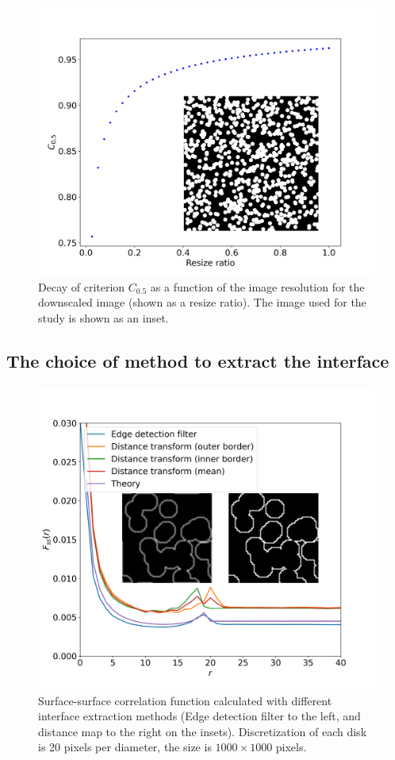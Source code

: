 \documentclass[reprint,amsmath,amssymb,aps,pre,showkeys,showpacs]{revtex4-1}
\begin{document}
\begin{figure}[ht]
  \centering
  \includegraphics[width=\linewidth]{images/plot-criterion1.png}
  \caption[]{Decay of criterion $C_{0.5}$ as a function of the image resolution
    for the downscaled image (shown as a resize ratio). The image used for the study is shown as an inset.}
  \label{fig:crit-plot}
\end{figure}

\subsection{The choice of method to extract the interface}
\begin{figure}[ht]
  \centering
  \includegraphics[width=\linewidth]{images/dm_sobel.png}
  \caption{Surface-surface correlation function calculated with different
    interface extraction methods (Edge detection filter to the left, and
    distance map to the right on the insets). Discretization of each disk is 20
    pixels per diameter, the size is $1000 \times 1000$ pixels.}
  \label{fig:interface-extraction}
\end{figure}
\end{document}
